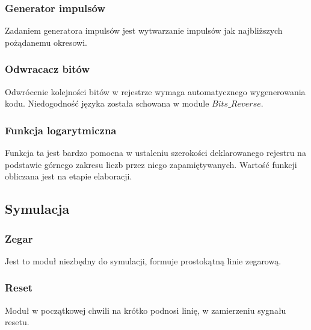 \documentclass[a4paper,12pt]{article}
\begin{document}
\subsubsection{Generator impulsów}
Zadaniem generatora impulsów jest wytwarzanie impulsów jak najbliższych pożądanemu okresowi.


\subsubsection{Odwracacz bitów}
Odwrócenie kolejności bitów w rejestrze wymaga automatycznego wygenerowania kodu. Niedogodność języka została schowana w module $Bits\_Reverse$.


\subsubsection{Funkcja logarytmiczna}
Funkcja ta jest bardzo pomocna w ustaleniu szerokości deklarowanego rejestru na podstawie górnego zakresu liczb przez niego zapamiętywanych. Wartość funkcji obliczana jest na etapie elaboracji.


\subsection{Symulacja}

\subsubsection{Zegar}
Jest to moduł niezbędny do symulacji, formuje prostokątną linie zegarową.


\subsubsection{Reset}
Moduł w początkowej chwili na krótko podnosi linię, w zamierzeniu sygnału resetu.

\end{document}
